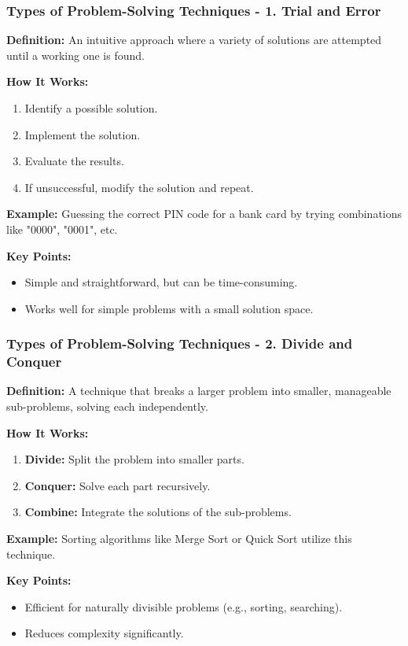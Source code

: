 \documentclass{beamer}
\begin{document}
\begin{frame}[fragile]
    \frametitle{Types of Problem-Solving Techniques - 1. Trial and Error}
    \textbf{Definition:} An intuitive approach where a variety of solutions are attempted until a working one is found.

    \textbf{How It Works:}
    \begin{enumerate}
        \item Identify a possible solution.
        \item Implement the solution.
        \item Evaluate the results.
        \item If unsuccessful, modify the solution and repeat.
    \end{enumerate}

    \textbf{Example:} Guessing the correct PIN code for a bank card by trying combinations like "0000", "0001", etc.

    \textbf{Key Points:}
    \begin{itemize}
        \item Simple and straightforward, but can be time-consuming.
        \item Works well for simple problems with a small solution space.
    \end{itemize}
\end{frame}

\begin{frame}[fragile]
    \frametitle{Types of Problem-Solving Techniques - 2. Divide and Conquer}
    \textbf{Definition:} A technique that breaks a larger problem into smaller, manageable sub-problems, solving each independently.

    \textbf{How It Works:}
    \begin{enumerate}
        \item \textbf{Divide:} Split the problem into smaller parts.
        \item \textbf{Conquer:} Solve each part recursively.
        \item \textbf{Combine:} Integrate the solutions of the sub-problems.
    \end{enumerate}

    \textbf{Example:} Sorting algorithms like Merge Sort or Quick Sort utilize this technique.

    \textbf{Key Points:}
    \begin{itemize}
        \item Efficient for naturally divisible problems (e.g., sorting, searching).
        \item Reduces complexity significantly.
    \end{itemize}
\end{frame}
\end{document}
